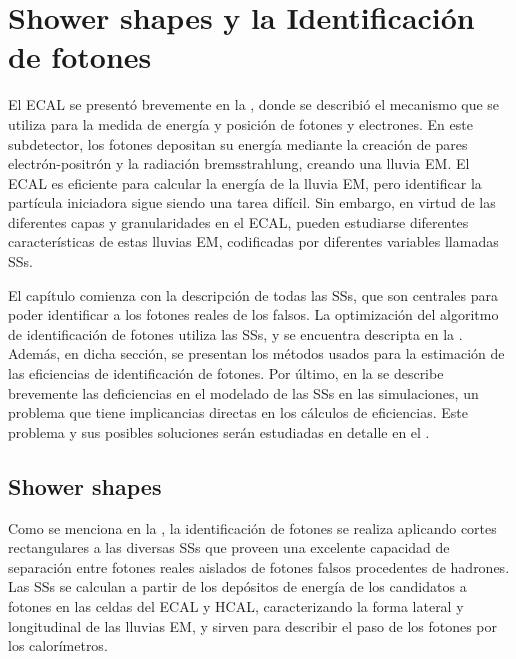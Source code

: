 \chapter{Shower shapes y la Identificaci\'on de fotones}
\label{ch:pid_ss}



El \ac{ECAL} se presentó brevemente en la \Sect{\ref{subsubsec:atlas:atlas:cals:ecal}}, donde se describió el mecanismo que se utiliza para la medida de energ\'ia y posici\'on de fotones y electrones. En este subdetector, los fotones depositan su energía mediante la creación de pares electrón-positrón y la radiación bremsstrahlung, creando una lluvia \acf{EM}. El \ac{ECAL} es eficiente para calcular la energía de la lluvia \ac{EM}, pero identificar la partícula iniciadora sigue siendo una tarea difícil.
Sin embargo, en virtud de las diferentes capas y granularidades en el \ac{ECAL}, pueden estudiarse diferentes características de estas lluvias \ac{EM}, codificadas por diferentes variables llamadas \acfp{SS}.

El cap\'itulo comienza con la descripci\'on de todas las \acp{SS}, que son centrales para poder identificar a los fotones reales de los falsos.
La optimizaci\'on del algoritmo de identificaci\'on de fotones utiliza las \acp{SS}, y se encuentra descripta en la \Sect{\ref{sec:pid_ss:pid}}. Adem\'as, en dicha secci\'on, se presentan los m\'etodos usados para la estimaci\'on de las eficiencias de identificaci\'on de fotones.
Por último, en la \Sect{\ref{sec:pid_ss:ss_differences}} se describe brevemente las deficiencias en el modelado de las \acp{SS} en las simulaciones, un problema que tiene implicancias directas en los c\'alculos de eficiencias. Este problema y sus posibles soluciones ser\'an estudiadas en detalle en el \Ch{\ref{ch:ss_corrections}}.






\section{Shower shapes}
\label{sec:pid_ss:ss}

Como se menciona en la \Sect{\ref{subsec:objects:egamma:id}}, la identificación de fotones se realiza aplicando cortes rectangulares a las diversas \acp{SS} que proveen una excelente capacidad de separación entre fotones reales aislados de fotones falsos procedentes de hadrones. Las \acp{SS} se calculan a partir de los depósitos de energía de los candidatos a fotones en las celdas del \ac{ECAL} y \ac{HCAL}, caracterizando la forma lateral y longitudinal de las lluvias \ac{EM}, y sirven para describir el paso de los fotones por los calorímetros.

